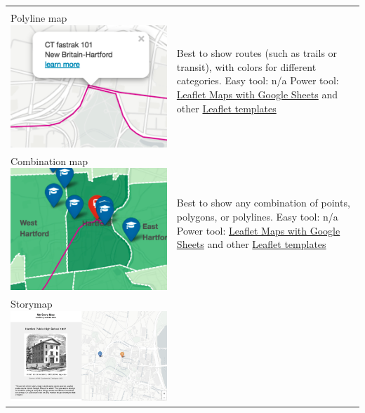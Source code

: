 \documentclass[
  english,
]{book}
\begin{document}
\begin{longtable}[]{@{}ll@{}}
\begin{minipage}[t]{0.47\columnwidth}
\end{minipage}\tabularnewline
\begin{minipage}[t]{0.47\columnwidth}\raggedright
Polyline map \includegraphics{images/06-map/map-polyline.png}\strut
\end{minipage} & \begin{minipage}[t]{0.47\columnwidth}\raggedright
Best to show routes (such as trails or transit), with colors for different categories. Easy tool: n/a Power tool: \href{leaflet-maps-with-google-sheets}{Leaflet Maps with Google Sheets} and other \href{leaflet}{Leaflet templates}\strut
\end{minipage}\tabularnewline
\begin{minipage}[t]{0.47\columnwidth}\raggedright
Combination map \includegraphics{images/06-map/map-point-polygon-polyline.png}\strut
\end{minipage} & \begin{minipage}[t]{0.47\columnwidth}\raggedright
Best to show any combination of points, polygons, or polylines. Easy tool: n/a Power tool: \href{leaflet-maps-with-google-sheets}{Leaflet Maps with Google Sheets} and other \href{leafletl}{Leaflet templates}\strut
\end{minipage}\tabularnewline
\begin{minipage}[t]{0.47\columnwidth}\raggedright
Storymap \includegraphics{images/06-map/map-storymap.png}\strut

\end{minipage}
\end{longtable}
\end{document}
